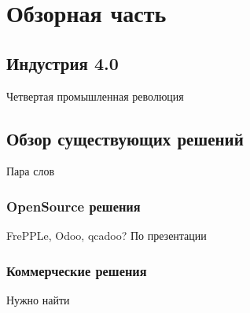\chapter{Обзорная часть}
\section{Индустрия 4.0}
Четвертая промышленная революция


\section{Обзор существующих решений}
Пара слов
\subsection{OpenSource решения}
FrePPLe, Odoo, qcadoo?
По презентации
\subsection{Коммерческие решения}
Нужно найти
